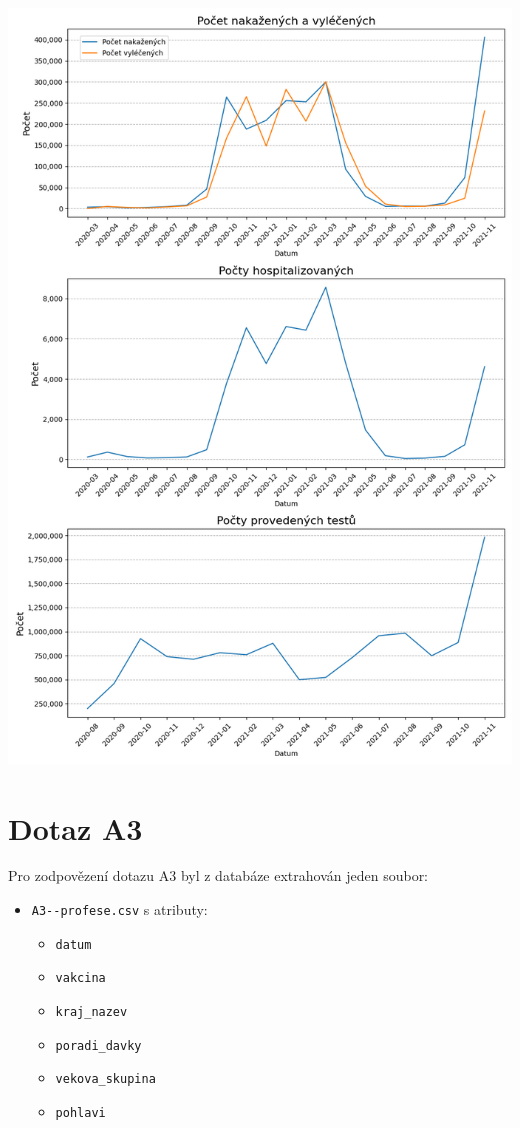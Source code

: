 \documentclass[12pt]{article}
\begin{document}
\begin{center}
    \includegraphics[width=0.63\paperwidth]{A1-vyvoj_situace.png}
    \label{A1}
\end{center}

\section{Dotaz A3}
Pro zodpovězení dotazu A3 byl z databáze extrahován jeden soubor:
\begin{itemize}
    \item \texttt{A3-\ockovani-profese.csv} s atributy:
        \begin{itemize}
            \item \texttt{datum}
            \item \texttt{vakcina}
            \item \texttt{kraj\_nazev}
            \item \texttt{poradi\_davky}
            \item \texttt{vekova\_skupina}
            \item \texttt{pohlavi}
        \end{itemize}
\end{itemize}
\end{document}
